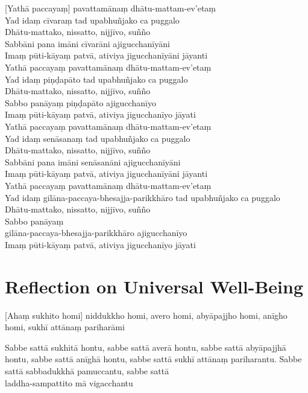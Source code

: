[Yathā paccayaṃ] pavattamānaṃ dhātu-mattam-ev'etaṃ\\
Yad idaṃ cīvaraṃ tad upabhuñjako ca puggalo\\
Dhātu-mattako, nissatto, nijjīvo, suñño\\
Sabbāni pana imāni cīvarāni ajigucchanīyāni\\
Imaṃ pūti-kāyaṃ patvā, ativiya jigucchanīyāni jāyanti\\
Yathā paccayaṃ pavattamānaṃ dhātu-mattam-ev'etaṃ\\
Yad idaṃ piṇḍapāto tad upabhuñjako ca puggalo\\
Dhātu-mattako, nissatto, nijjīvo, suñño\\
Sabbo panāyaṃ piṇḍapāto ajigucchanīyo\\
Imaṃ pūti-kāyaṃ patvā, ativiya jigucchanīyo jāyati\\
Yathā paccayaṃ pavattamānaṃ dhātu-mattam-ev'etaṃ\\
Yad idaṃ senāsanaṃ tad upabhuñjako ca puggalo\\
Dhātu-mattako, nissatto, nijjīvo, suñño\\
Sabbāni pana imāni senāsanāni ajigucchanīyāni\\
Imaṃ pūti-kāyaṃ patvā, ativiya jigucchanīyāni jāyanti\\
Yathā paccayaṃ pavattamānaṃ dhātu-mattam-ev'etaṃ\\
Yad idaṃ gilāna-paccaya-bhesajja-parikkhāro tad upabhuñjako ca puggalo\\
Dhātu-mattako, nissatto, nijjīvo, suñño\\
Sabbo panāyaṃ\\
gilāna-paccaya-bhesajja-parikkhāro ajigucchanīyo\\
Imaṃ pūti-kāyaṃ patvā, ativiya jigucchanīyo jāyati

\section{Reflection on Universal Well-Being}


\begin{leader}
\end{leader}


[Ahaṃ sukhito homi] niddukkho homi, avero homi, abyāpajjho homi, anīgho homi,
sukhī attānaṃ pariharāmi

Sabbe sattā sukhitā hontu, sabbe sattā averā hontu, sabbe sattā abyāpajjhā
hontu, sabbe sattā anīghā hontu, sabbe sattā sukhī attānaṃ pariharantu. Sabbe
sattā sabbadukkhā pamuccantu, sabbe sattā\\
laddha-sampattito mā vigacchantu

